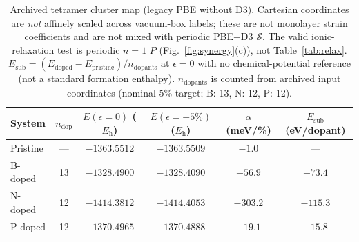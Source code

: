 
\begin{table}[!ht]
\caption{\label{tab:I}Archived tetramer cluster map (legacy PBE without D3). Cartesian coordinates are \emph{not} affinely scaled across vacuum-box labels; these are not monolayer strain coefficients and are not mixed with periodic PBE+D3 $\mathcal{S}$. The valid ionic-relaxation test is periodic $n{=}1$ $P$ (Fig.~\ref{fig:synergy}(c)), not Table~\ref{tab:relax}.
$E_{\mathrm{sub}}=(E_{\mathrm{doped}}-E_{\mathrm{pristine}})/n_{\mathrm{dopants}}$ at $\epsilon{=}0$ with no chemical-potential reference (not a standard formation enthalpy).
$n_{\mathrm{dopants}}$ is counted from archived input coordinates (nominal 5\% target; B: 13, N: 12, P: 12).}
\begin{ruledtabular}
\begin{tabular}{lccccc}
System & $n_{\mathrm{dop}}$ & $E(\epsilon{=}0)$ ($E_{\mathrm{h}}$) & $E(\epsilon{=}+5\%)$ ($E_{\mathrm{h}}$) & $\alpha$ (meV/\%) & $E_{\mathrm{sub}}$ (eV/dopant) \\
\hline
Pristine & --- & $-1363.5512$ & $-1363.5509$ & $-1.0$ & --- \\
B-doped & 13 & $-1328.4900$ & $-1328.4090$ & $+56.9$ & $+73.4$ \\
N-doped & 12 & $-1414.3812$ & $-1414.4053$ & $-303.2$ & $-115.3$ \\
P-doped & 12 & $-1370.4965$ & $-1370.4888$ & $-19.1$ & $-15.8$ \\
\end{tabular}
\end{ruledtabular}
\end{table}

